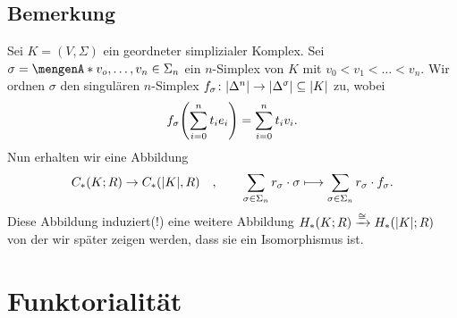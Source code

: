 \begin{enumerate}[1)]
%
\end{enumerate}

\subsection[Bemerkung: Vorgehen, um später zu zeigen: $H_*(K;R) \cong H_*(\abs*{K};R )$]{Bemerkung} %
\label{sub:511}
Sei $K=(V,\Sigma)$ ein geordneter simplizialer Komplex. Sei $\sigma= \set{v_o, \ldots , v_n} \in \Sigma_n $ ein $n$-Simplex von $K$ mit $v_0 < v_1 < \ldots < v_n$. Wir
ordnen $\sigma$ den singulären $n$-Simplex $f_\sigma \colon \abs*{\Delta^n} \to \abs*{\Delta^\sigma} \subseteq \abs*{K}$ zu, wobei
\begin{align*}
	f_\sigma \enbrace*{\sum_{i=0}^{n} t_i e_i} = \sum_{i=0}^{n} t_i v_i. 
\end{align*}
Nun erhalten wir eine Abbildung 
\[
	C_*(K;R) \to C_*(\abs*{K},R) \quad , \qquad   \sum_{\sigma \in \Sigma_n} r_\sigma \cdot \sigma \longmapsto \sum_{\sigma \in \Sigma_n} r_\sigma \cdot f_\sigma.
\]
Diese Abbildung induziert(!) eine weitere Abbildung $H_*(K;R) \xrightarrow{\cong} H_*(\abs*{K};R )$ von der wir später zeigen werden, dass sie ein Isomorphismus ist.
\newpage

\section{Funktorialität} %
\label{sec:6}

